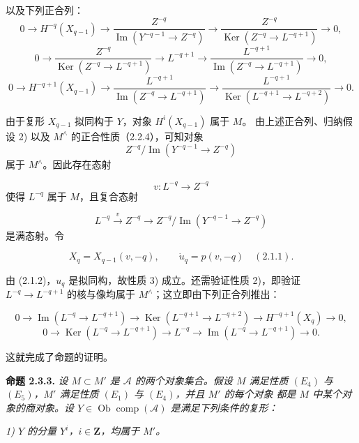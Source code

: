 \clearpage
{}%
\begingroup\small\setlength{\parskip}{0pt}\setlength{\emergencystretch}{1.5em}
\setlength{\abovedisplayskip}{4pt plus 2pt minus 2pt}%
\setlength{\belowdisplayskip}{4pt plus 2pt minus 2pt}%

以及下列正合列：
\[
0\longrightarrow H^{-q}(X_{q-1})\longrightarrow
\frac{Z^{-q}}{\operatorname{Im}(Y^{-q-1}\longrightarrow Z^{-q})}
\longrightarrow
\frac{Z^{-q}}{\operatorname{Ker}(Z^{-q}\longrightarrow L^{-q+1})}
\longrightarrow0,
\]
\[
0\longrightarrow
\frac{Z^{-q}}{\operatorname{Ker}(Z^{-q}\longrightarrow L^{-q+1})}
\longrightarrow L^{-q+1}\longrightarrow
\frac{L^{-q+1}}{\operatorname{Im}(Z^{-q}\longrightarrow L^{-q+1})}
\longrightarrow0,
\]
\[
0\longrightarrow H^{-q+1}(X_{q-1})\longrightarrow
\frac{L^{-q+1}}{\operatorname{Im}(Z^{-q}\longrightarrow L^{-q+1})}
\longrightarrow
\frac{L^{-q+1}}{\operatorname{Ker}(L^{-q+1}\longrightarrow L^{-q+2})}
\longrightarrow0.
\]

由于复形 $X_{q-1}$ 拟同构于 $Y$，对象 $H^i(X_{q-1})$ 属于 $M$。
由上述正合列、归纳假设 2) 以及 $M^\wedge$ 的正合性质（2.2.4），可知对象
\[
Z^{-q}/\operatorname{Im}(Y^{-q-1}\longrightarrow Z^{-q})
\]
属于 $M^\wedge$。因此存在态射

\[
v\colon L^{-q}\longrightarrow Z^{-q}
\]
使得 $L^{-q}$ 属于 $M$，且复合态射

\[
L^{-q}\xrightarrow{v}Z^{-q}\longrightarrow
Z^{-q}/\operatorname{Im}(Y^{-q-1}\longrightarrow Z^{-q})
\]
是满态射。令

\[
X_q=X_{q-1}(v,-q),
\qquad
\dot u_q=p(v,-q)\quad(2.1.1).
\]

由 (2.1.2)，$u_q$ 是拟同构，故性质 3) 成立。还需验证性质 2)，即验证
$L^{-q}\longrightarrow L^{-q+1}$ 的核与像均属于 $M^\wedge$；这立即由下列正合列推出：

\[
0\longrightarrow\operatorname{Im}(L^{-q}\longrightarrow L^{-q+1})
\longrightarrow\operatorname{Ker}(L^{-q+1}\longrightarrow L^{-q+2})
\longrightarrow H^{-q+1}(X_q)\longrightarrow0,
\]
\[
0\longrightarrow\operatorname{Ker}(L^{-q}\longrightarrow L^{-q+1})
\longrightarrow L^{-q}\longrightarrow
\operatorname{Im}(L^{-q}\longrightarrow L^{-q+1})\longrightarrow0.
\]

这就完成了命题的证明。

\medskip\noindent\textbf{命题 2.3.3.}
\textit{设 $M\subset M'$ 是 $\mathcal A$ 的两个对象集合。假设 $M$ 满足性质
$(E_4)$ 与 $(E_5)$，$M'$ 满足性质 $(E_1)$ 与 $(E_4)$，并且 $M'$ 的每个对象
都是 $M$ 中某个对象的商对象。设
$Y\in\operatorname{Ob}\operatorname{comp}(\mathcal A)$ 是满足下列条件的复形：}

\noindent\textit{1) $Y$ 的分量 $Y^i$，$i\in\mathbf Z$，均属于 $M'$。}
\endgroup
